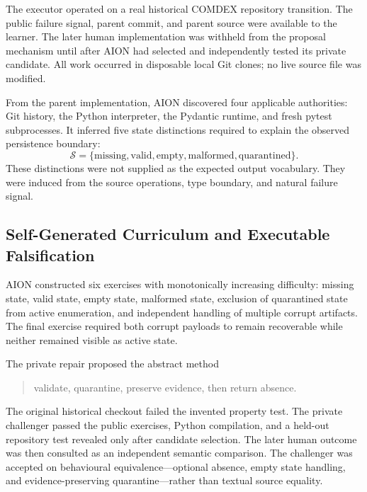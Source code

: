 The executor operated on a real historical COMDEX repository transition.  The
public failure signal, parent commit, and parent source were available to the
learner.  The later human implementation was withheld from the proposal
mechanism until after AION had selected and independently tested its private
candidate.  All work occurred in disposable local Git clones; no live source
file was modified.

From the parent implementation, AION discovered four applicable authorities:
Git history, the Python interpreter, the Pydantic runtime, and fresh pytest
subprocesses.  It inferred five state distinctions required to explain the
observed persistence boundary:
\begin{equation}
\mathcal{S}=\{
\mathrm{missing},\mathrm{valid},\mathrm{empty},
\mathrm{malformed},\mathrm{quarantined}
\}.
\label{eq:invented-persistent-states}
\end{equation}
These distinctions were not supplied as the expected output vocabulary.
They were induced from the source operations, type boundary, and natural
failure signal.

\subsection{Self-Generated Curriculum and Executable Falsification}
\label{subsec:apprenticeship-self-generated-exercises}

AION constructed six exercises with monotonically increasing difficulty:
missing state, valid state, empty state, malformed state, exclusion of
quarantined state from active enumeration, and independent handling of
multiple corrupt artifacts.  The final exercise required both corrupt payloads
to remain recoverable while neither remained visible as active state.

The private repair proposed the abstract method
\begin{quote}
validate, quarantine, preserve evidence, then return absence.
\end{quote}
The original historical checkout failed the invented property test.  The
private challenger passed the public exercises, Python compilation, and a
held-out repository test revealed only after candidate selection.  The later
human outcome was then consulted as an independent semantic comparison.  The
challenger was accepted on behavioural equivalence---optional absence, empty
state handling, and evidence-preserving quarantine---rather than textual source
equality.

